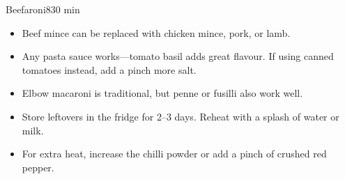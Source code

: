 \begin{recipebox}{Beefaroni}{8}{30 min}
  \begin{notes}
    \begin{itemize}
      \item Beef mince can be replaced with chicken mince, pork, or lamb.
      \item Any pasta sauce works—tomato basil adds great flavour. If using canned tomatoes instead, add a pinch more salt.
      \item Elbow macaroni is traditional, but penne or fusilli also work well.
      \item Store leftovers in the fridge for 2–3 days. Reheat with a splash of water or milk.
      \item For extra heat, increase the chilli powder or add a pinch of crushed red pepper.
    \end{itemize}
  \end{notes}
\end{recipebox}